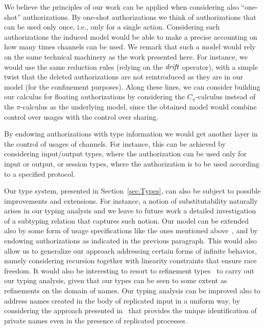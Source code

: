 We believe the principles of our work can be applied when considering also ``one-shot'' authorizations. By one-shot authorizations we think of authorizations that can be used only once, i.e., only for a single action. Considering such authorizations the induced model would be able to make a precise accounting on how many times channels can be used. We remark that such a model would rely on the same technical machinery as the work presented here. For instance, we would use the same reduction rules (relying on the $\mathit {drift}$ operator), with a simple twist that the deleted authorizations are not reintroduced as they are in our model (for the confinement purposes).  
Along these lines, we can consider building our calculus for floating authorizations by considering the $C_\pi$-calculus instead of the $\pi$-calculus as the underlying model, since the obtained model would combine control over usages with the control over sharing.



By endowing authorizations with type information we would get another layer in the control of usages of channels. For instance, this can be achieved by considering input/output types, where the authorization can be used only for input or output, or session types, where the authorization is to be used according to a specified protocol.

Our type system, presented in Section~\ref{sec:Types}, can also be subject to possible improvements  and extensions. For instance, a notion of substitutability naturally arises in our typing analysis and we leave to future work a detailed 
investigation of a subtyping relation that captures such notion.
Our model can be extended also by some form of usage specifications like
the ones mentioned above~\cite{DBLP:journals/scp/BodeiDF17,DBLP:journals/lmcs/KobayashiSW06}, and
by endowing authorizations as indicated in the previous paragraph. %
This would also allow us to generalize our approach addressing certain forms of infinite behavior, namely considering recursion 
together with linearity constraints that ensure race freedom. It would also be interesting to resort to refinement 
types~\cite{DBLP:conf/pldi/FreemanP91} to carry out our typing analysis, given that our types 
can be seen to some extent as refinements on the domain of names.
Our typing analysis can be improved also to address names created in the body of replicated input in a uniform way, by considering the approach presented in~\cite{francalanza2018pointing} that provides the unique identification of private names even in the presence of replicated processes.

